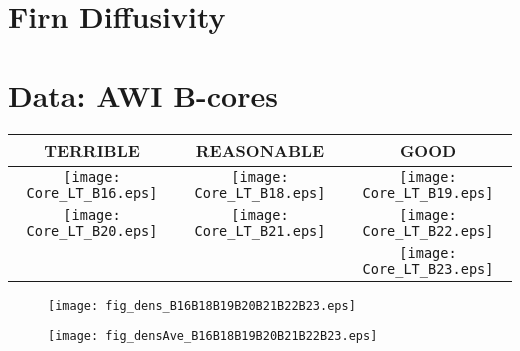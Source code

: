 \documentclass[../../CompleteThesis/Complete_1stDraft.tex]{subfiles}
\begin{document}
\section[Appendix I]{Firn Diffusivity}
\label{App:FirnDiffusivity}


\section[Appendix II]{Data: AWI B-cores}
\label{App:Data_AWI}


\newpage
\begin{rotatepage}
	\begin{landscape}
		\begin{table}
			\centering
			\begin{tabular}{c||c||c}
				\textcolor{BrickRed}{\textbf{TERRIBLE}} & \textcolor{YellowOrange}{\textbf{REASONABLE}} & \textcolor{OliveGreen}{\textbf{GOOD}} \\
				\hline
				\texttt{[image: Core\_LT\_B16.eps]} & \texttt{[image: Core\_LT\_B18.eps]} & \texttt{[image: Core\_LT\_B19.eps]} \\
				\texttt{[image: Core\_LT\_B20.eps]} & \texttt{[image: Core\_LT\_B21.eps]} & \texttt{[image: Core\_LT\_B22.eps]} \\	
				& & \texttt{[image: Core\_LT\_B23.eps]} \\
			\end{tabular}
		\end{table}
	\end{landscape}
\end{rotatepage}
\newpage

\begin{rotatepage}
	\begin{landscape}
		\begin{figure}[h]
			\centering
			\texttt{[image: fig\_dens\_B16B18B19B20B21B22B23.eps]}
			\label{fig:dens}
			\caption{}
		\end{figure}
	\end{landscape}
\end{rotatepage}
\newpage
\begin{rotatepage}
	\begin{landscape}
		\begin{figure}[h]
			\centering
			\texttt{[image: fig\_densAve\_B16B18B19B20B21B22B23.eps]}
			\label{fig:densAve}
			\caption{}
		\end{figure}
	\end{landscape}
\end{rotatepage}
\newpage 
\end{document}
